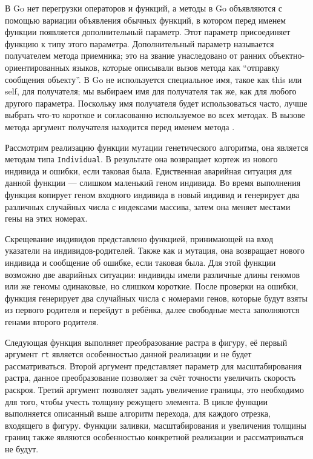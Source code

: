 \documentclass[14pt]{extarticle}
\begin{document}
	В Go нет перегрузки операторов и функций, а методы в Go объявляются с помощью вариации объявления обычных функций, в кото­ром перед именем функции появляется дополнительный параметр. Этот параметр присоединяет функцию к типу этого параметра. Дополнительный параметр называется получателем метода приемника; это на­	звание унаследовано от ранних объектно-ориентированных языков, которые описы­вали вызов метода как “отправку сообщения объекту”. В Go не используется специальное имя, такое как this или self, для получателя; мы выбираем имя для получателя так же, как для любого другого параметра. Поскольку имя получателя будет использоваться часто, лучше выбрать что-то короткое и согласованно используемое во всех методах. В вызове метода аргумент получателя находится перед именем метода \cite{Golang}.

	
	Рассмотрим реализацию функции мутации генетического алгоритма, она является методам типа \lstinline|Individual|. В результате она возвращает кортеж из нового индивида и ошибки, если таковая была. Едиственная аварийная ситуация для данной функции --- слишком маленький геном индивида. Во время выполнения функция копирует геном входного индивида в новый индивид и генерирует два различных случайных числа с индексами массива, затем она меняет местами гены на этих номерах.
	
	
	Скрещевание индивидов представлено функцией, принимающей на вход указатели на индивидов-родителей. Также как и мутация, она возвращает нового индивида и сообщение об ошибке, если таковая была. Для этой функции возможно две аварийных ситуации: индивиды имели различные длины геномов или же геномы одинаковые, но слишком короткие. После проверки на ошибки, функция генерирует два случайных числа с номерами генов, которые будут взяты из первого родителя и перейдут в ребёнка, далее свободные места заполняются генами второго родителя.
	
	
	Следующая функция выполняет преобразование растра в фигуру, её первый аргумент  \lstinline|rt| является особенностью данной реализации и не будет рассматриваться. Второй аргумент представляет параметр для масштабирования растра, данное преобразование позволяет за счёт точности увеличить скорость раскроя. Третий аргумент позволяет задать увеличение границы, это необходимо для того, чтобы учесть толщину режущего элемента. В цикле функции выполняется описанный выше алгоритм перехода, для каждого отрезка, входящего в фигуру. Функции заливки, масштабирования и увеличения толщины границ также являются особенностью конкретной реализации и рассматриваться не будут.
	
	
\end{document}
